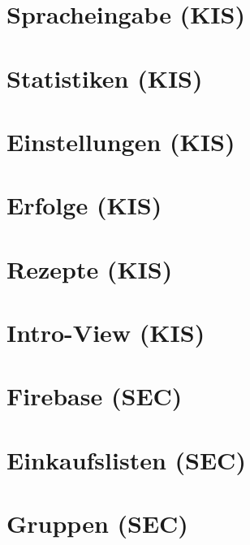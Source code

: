 \documentclass[
    headings=optiontotocandhead,%
    twoside,
    numbers=noenddot,%
    toc=flat, %
    12pt, %
    titlepage, %
    parskip=full, %
    listof=totoc, %
    listof=flat, %
    numbers=noenddot, %
    bibliography=totoc, %
    a4paper,DIV=14,
    BCOR=15mm,
]{scrbook}
\begin{document}
\chapter{Spracheingabe (KIS)}
\renewcommand{\kapitelautor}{Autor: Daniel Kisling}

\chapter{Statistiken (KIS)}
\renewcommand{\kapitelautor}{Autor: Daniel Kisling}

\chapter{Einstellungen (KIS)}
\renewcommand{\kapitelautor}{Autor: Daniel Kisling}


\chapter{Erfolge (KIS)}
\renewcommand{\kapitelautor}{Autor: Daniel Kisling}

\chapter{Rezepte (KIS)}
\renewcommand{\kapitelautor}{Autor: Daniel Kisling}

\chapter{Intro-View (KIS)}
\renewcommand{\kapitelautor}{Autor: Daniel Kisling}

\chapter{Firebase (SEC)}
\renewcommand{\kapitelautor}{Autor: Tobias Seczer}


\chapter{Einkaufslisten (SEC)}
\renewcommand{\kapitelautor}{Autor: Tobias Seczer}

\chapter{Gruppen (SEC)}
\renewcommand{\kapitelautor}{Autor: Tobias Seczer}

\end{document}

